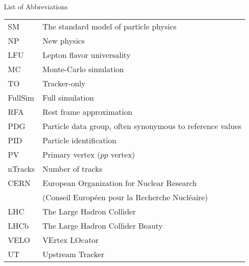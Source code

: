 \singlespacing \normalsize
\hbox{\ }

\vspace{.5in}

\begin{center}
\large{List of Abbreviations}
\end{center}

\vspace{3pt}

\begin{supertabular}{ll}
    SM      & The standard model of particle physics \\
    NP      & New physics \\
    LFU     & Lepton flavor universality \\
    MC      & Monte-Carlo simulation \\
    TO      & Tracker-only \\
    FullSim & Full simulation \\
    RFA     & Rest frame approximation \\
    PDG     & Particle data group, often synonymous to reference values \\
    PID     & Particle identification \\
    PV      & Primary vertex ($pp$ vertex) \\
    nTracks & Number of tracks \\
    CERN    & European Organization for Nuclear Research \\
            & (Conseil Européen pour la Recherche Nucléaire) \\
    LHC     & The Large Hadron Collider \\
    LHCb    & The Large Hadron Collider Beauty \\
    VELO    & VErtex LOcator \\
    UT      & Upstream Tracker \\
\end{supertabular}

